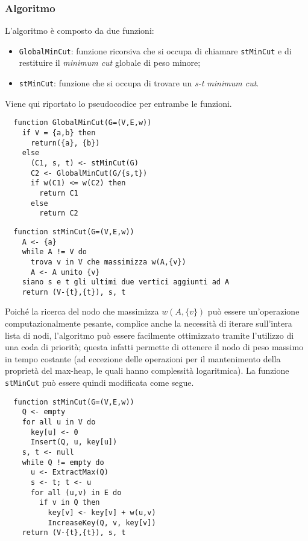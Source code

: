 \subsubsection{Algoritmo}

L'algoritmo è composto da due funzioni:
\begin{itemize}
  \item \texttt{GlobalMinCut}: funzione ricorsiva che si occupa di chiamare \texttt{stMinCut} e di restituire il \textit{minimum cut} globale di peso minore;
  \item \texttt{stMinCut}: funzione che si occupa di trovare un \textit{s-t minimum cut}.
\end{itemize}

\noindent Viene qui riportato lo pseudocodice per entrambe le funzioni.

\begin{verbatim}
  function GlobalMinCut(G=(V,E,w))
    if V = {a,b} then
      return({a}, {b})
    else
      (C1, s, t) <- stMinCut(G)
      C2 <- GlobalMinCut(G/{s,t})
      if w(C1) <= w(C2) then
        return C1
      else
        return C2
\end{verbatim}

\begin{verbatim}
  function stMinCut(G=(V,E,w))
    A <- {a}
    while A != V do
      trova v in V che massimizza w(A,{v})
      A <- A unito {v}
    siano s e t gli ultimi due vertici aggiunti ad A
    return (V-{t},{t}), s, t
\end{verbatim}

Poiché la ricerca del nodo che massimizza \(w(A,\{v\})\) può essere un'operazione computazionalmente pesante, complice anche la necessità di iterare sull'intera lista di nodi, l'algoritmo può essere facilmente ottimizzato tramite l'utilizzo di una coda di priorità; questa infatti permette di ottenere il nodo di peso massimo in tempo costante (ad eccezione delle operazioni per il mantenimento della proprietà del max-heap, le quali hanno complessità logaritmica). La funzione \texttt{stMinCut} può essere quindi modificata come segue.

\newpage
\begin{verbatim}
  function stMinCut(G=(V,E,w))
    Q <- empty
    for all u in V do
      key[u] <- 0
      Insert(Q, u, key[u])
    s, t <- null
    while Q != empty do
      u <- ExtractMax(Q)
      s <- t; t <- u
      for all (u,v) in E do
        if v in Q then
          key[v] <- key[v] + w(u,v)
          IncreaseKey(Q, v, key[v])
    return (V-{t},{t}), s, t
\end{verbatim}

